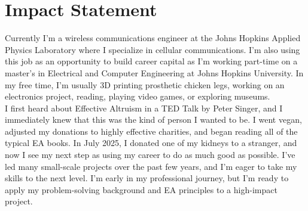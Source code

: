 \documentclass[10pt, letterpaper]{article}
\newenvironment{onecolentry}{
    \begin{adjustwidth}{0.2 cm}{0.2 cm}
}{
    \end{adjustwidth}
}
\begin{document}
    \section{Impact Statement}
        \begin{onecolentry}
            Currently I'm a wireless communications engineer at the Johns Hopkins Applied Physics Laboratory where I specialize in cellular communications. 
            I'm also using this job as an opportunity to build career capital as I'm working part-time on a master's in Electrical and Computer Engineering at
            Johns Hopkins University. In my free time, I'm usually 3D printing prosthetic chicken legs, working on an electronics project, reading, 
            playing video games, or exploring museums. \\
            I first heard about Effective Altruism in a TED Talk by Peter Singer, and I immediately knew that this was the kind of person I wanted to be. I went vegan, 
            adjusted my donations to highly effective charities, and began reading all of the typical EA books. In July 2025, I donated one of my kidneys to a 
            stranger, and now I see my next step as using my career to do as much good as possible.  
            I've led many small-scale projects over the past few years, and I'm eager to take my skills to the next level.
            I'm early in my professional journey, but I'm ready to apply my problem-solving background and EA principles to a high-impact project.
        \end{onecolentry}

    \vspace{0.3 cm - 0.3 cm}
\end{document}
